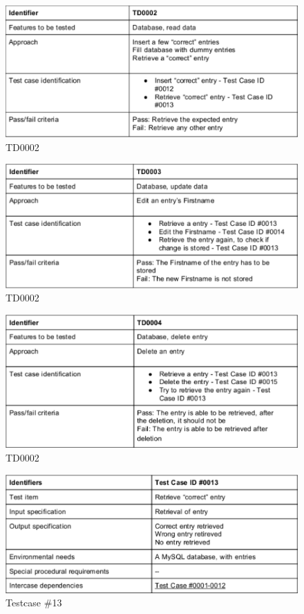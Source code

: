 \begin{figure}
 \includegraphics[scale=1]{images/dbtesttd0002}
  \caption{TD0002}
  \label{fig:td0002}
\end{figure}
\begin{figure}
 \includegraphics[scale=1]{images/dbtesttd0003}
  \caption{TD0002}
  \label{fig:td0003}
\end{figure}
\begin{figure}
 \includegraphics[scale=1]{images/dbtesttd0004}
  \caption{TD0002}
  \label{fig:td0004}
\end{figure}

\begin{figure}
 \includegraphics[scale=1]{images/dbtestcase13}
  \caption{Testcase \#13}
  \label{fig:dbcase13}
\end{figure}

